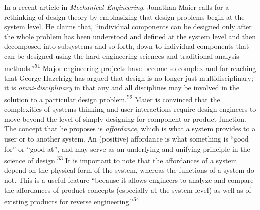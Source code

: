 In a recent article in \textit{Mechanical Engineering}, Jonathan Maier
calls for a rethinking of design theory by emphasizing that design
problems begin at the system level. He claims that, “individual
components can be designed only after the whole problem has been
understood and defined at the system level and then decomposed into
subsystems and so forth, down to individual components that can be
designed using the hard engineering sciences and traditional analysis
methods.”\textsuperscript{51} Major engineering projects have become so
complex and far-reaching that George Hazelrigg has argued that design
is no longer just multidisciplinary; it is \textit{omni-disciplinary}
in that any and all disciplines may be involved in the solution to a
particular design problem.\textsuperscript{52} Maier is convinced that
the complexities of systems thinking and user interactions require
design engineers to move beyond the level of simply designing for
component or product function. The concept that he proposes is
\textit{affordance}, which is what a system provides to a user or to
another system. An (positive) affordance is what something is “good
for” or “good at”, and may serve as an underlying and unifying
principle in the science of design.\textsuperscript{53} It is important
to note that the affordances of a system depend on the physical form of
the system, whereas the functions of a system do not. This is a useful
feature “because it allows engineers to analyze and compare the
affordances of product concepts (especially at the system level) as
well as of existing products for reverse
engineering.”\textsuperscript{54} 


